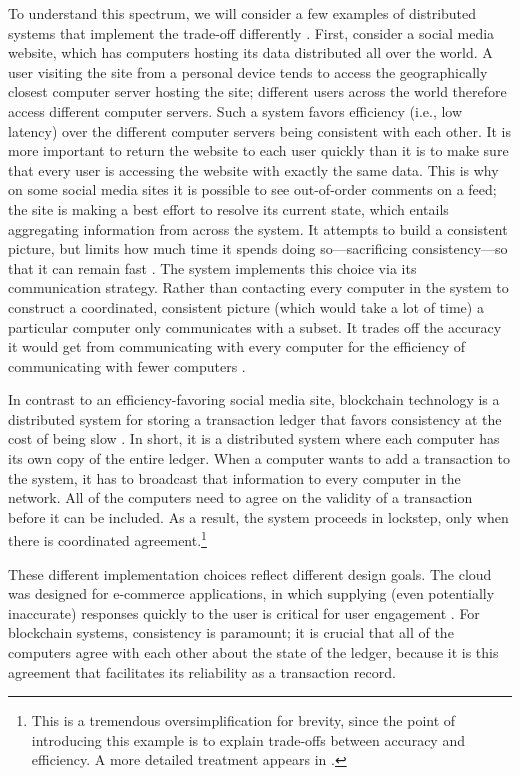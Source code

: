 \documentclass[sigplan,screen]{acmart}
\begin{document}
To understand this spectrum, we will consider a few examples of distributed systems that implement the trade-off differently \cite{DeCandia2007dynamo, Herlihy1990apologizing}. First, consider a social media website, which has computers hosting its data distributed all over the world. A user visiting the site from a personal device tends to access the geographically closest computer server hosting the site; different users across the world therefore access different computer servers. Such a system favors efficiency (i.e., low latency) over the different computer servers being consistent with each other. It is more important to return the website to each user quickly than it is to make sure that every user is accessing the website with exactly the same data. This is why on some social media sites it is possible to see out-of-order comments on a feed; the site is making a best effort to resolve its current state, which entails aggregating information from across the system. It attempts to build a consistent picture, but limits how much time it spends doing so---sacrificing consistency---so that it can remain fast  \cite{DeCandia2007dynamo, Lu2015Existential, Vogels2009eventualconsistency}. The system implements this choice via its communication strategy. Rather than contacting every computer in the system to construct a coordinated, consistent picture (which would take a lot of time) a particular computer only communicates with a subset. It trades off the accuracy it would get from communicating with every computer for the efficiency of communicating with fewer computers \cite{krishnamurthy2002tunable, hellerstein2019calm}.

In contrast to an efficiency-favoring social media site, blockchain technology is a distributed system for storing a transaction ledger that favors consistency at the cost of being slow \cite{nakamoto2012bitcoin}. In short, it is a distributed system where each computer has its own copy of the entire ledger. When a computer wants to add a transaction to the system, it has to broadcast that information to every computer in the network. All of the computers need to agree on the validity of a transaction before it can be included. As a result, the system proceeds in lockstep, only when there is coordinated agreement.\footnote{This is a tremendous oversimplification for brevity, since the point of introducing this example is to explain trade-offs between accuracy and efficiency. A more detailed treatment appears in \citet{narayanan2016bitcoin}.}

These different implementation choices reflect different design goals. The cloud was designed for e-commerce applications, in which supplying (even potentially inaccurate) responses quickly to the user is critical for user engagement \cite{bailis2012pbs, brutlag2009speedmatters}. For blockchain systems, consistency is paramount; it is crucial that all of the computers agree with each other about the state of the ledger, because it is this agreement that facilitates its reliability as a transaction record.
\end{document}
